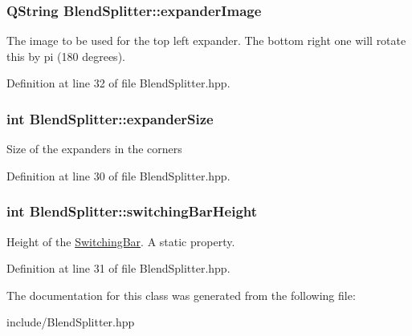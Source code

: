 \subsubsection[{\texorpdfstring{expander\+Image}{expanderImage}}]{\setlength{\rightskip}{0pt plus 5cm}Q\+String Blend\+Splitter\+::expander\+Image\hspace{0.3cm}{\ttfamily [static]}}\hypertarget{class_blend_splitter_a38c7ab0fb471718aca5eb3fe09aa124b}{}\label{class_blend_splitter_a38c7ab0fb471718aca5eb3fe09aa124b}
The image to be used for the top left expander. The bottom right one will rotate this by pi (180 degrees). 

Definition at line 32 of file Blend\+Splitter.\+hpp.

\subsubsection[{\texorpdfstring{expander\+Size}{expanderSize}}]{\setlength{\rightskip}{0pt plus 5cm}int Blend\+Splitter\+::expander\+Size\hspace{0.3cm}{\ttfamily [static]}}\hypertarget{class_blend_splitter_a233a45efce9417f826d76ce54d832d50}{}\label{class_blend_splitter_a233a45efce9417f826d76ce54d832d50}
Size of the expanders in the corners 

Definition at line 30 of file Blend\+Splitter.\+hpp.

\subsubsection[{\texorpdfstring{switching\+Bar\+Height}{switchingBarHeight}}]{\setlength{\rightskip}{0pt plus 5cm}int Blend\+Splitter\+::switching\+Bar\+Height\hspace{0.3cm}{\ttfamily [static]}}\hypertarget{class_blend_splitter_a478fa3cfcf59f76edf8f021bee297e0d}{}\label{class_blend_splitter_a478fa3cfcf59f76edf8f021bee297e0d}
Height of the \hyperlink{class_switching_bar}{Switching\+Bar}. A static property. 

Definition at line 31 of file Blend\+Splitter.\+hpp.



The documentation for this class was generated from the following file\+:\begin{DoxyCompactItemize}
\item 
include/Blend\+Splitter.\+hpp\end{DoxyCompactItemize}
